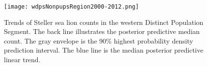 \documentclass[12pt,letter,draft]{article}
\begin{document}
\nocite{*}


\clearpage

\begin{figure}[htbp] %
   \centering
   \texttt{[image: wdpsNonpupsRegion2000-2012.png]} 
   \caption{Trends of Steller sea lion counts in the western Distinct Population Segment. The back line illustrates the posterior predictive median count. The gray envelope is the 90\% highest probability density prediction interval. The blue line is the median posterior predictive linear trend.}
   \label{fig:example}
\end{figure}
\end{document}
